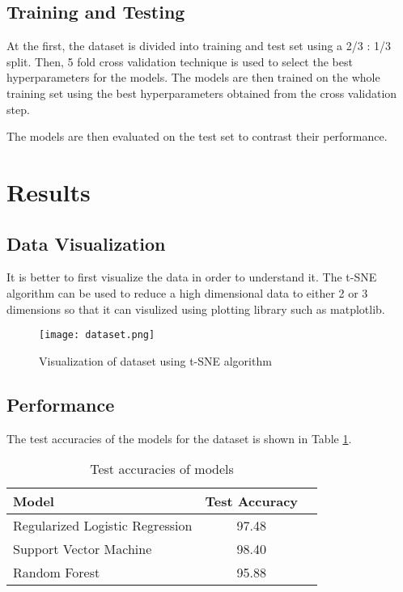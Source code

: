 \documentclass[12pt]{article}
\begin{document}
\subsection{Training and Testing}
At the first, the dataset is divided into training and test set using a 2/3 : 1/3 split. Then, 5 fold cross validation technique is used to select the best hyperparameters for the
models. The models are then trained on the whole training set using the best hyperparameters obtained from the cross validation step.

The models are then evaluated on the test set to contrast their performance.

\section{Results}
\subsection{Data Visualization}
It is better to first visualize the data in order to understand it. The t-SNE\cite{maaten2008visualizing} algorithm can be used to reduce a high dimensional data to either 2 or 3 dimensions so that it can visulized
using plotting library such as matplotlib\cite{hunter2007matplotlib}.

\begin{figure}[ht]
  \centering
  \texttt{[image: dataset.png]}
  \caption{Visualization of dataset using t-SNE algorithm}
  \label{fig:dataset}
\end{figure}

\subsection{Performance}
The test accuracies of the models for the dataset is shown in Table \ref{tbl:test_accuracies}.

\begin{table}[ht]
\centering
\begin{tabular}{ l c r }
\hline
Model & Test Accuracy \\
\hline
Regularized Logistic Regression & 97.48\\
Support Vector Machine & 98.40 \\
Random Forest & 95.88 \\
\hline
\end{tabular}
\caption{Test accuracies of models}
\label{tbl:test_accuracies}
\end{table}
\end{document}
